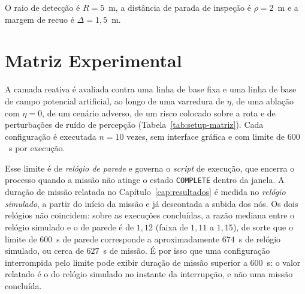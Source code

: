 O raio de detecção é $R=5$~m, a distância de parada de inspeção é $\rho=2$~m e a
margem de recuo é $\Delta=1{,}5$~m.

\section{Matriz Experimental}
\label{sec:setup-matriz}

A camada reativa é avaliada contra uma linha de base fixa e uma linha de base de
campo potencial artificial, ao longo de uma varredura de $\eta$, de uma ablação com
$\eta=0$, de um cenário adverso, de um risco colocado sobre a rota e de perturbações
de ruído de percepção (Tabela~\ref{tab:setup-matriz}). Cada configuração é executada
$n=10$ vezes, sem interface gráfica e com limite de $600$~s por execução.

Esse limite é de \emph{relógio de parede} e governa o \textit{script} de execução, que
encerra o processo quando a missão não atinge o estado \texttt{COMPLETE} dentro da
janela. A duração de missão relatada no Capítulo~\ref{cap:resultados} é medida no
\emph{relógio simulado}, a partir do início da missão e já descontada a subida dos nós.
Os dois relógios não coincidem: sobre as execuções concluídas, a razão mediana entre o
relógio simulado e o de parede é de $1{,}12$ (faixa de $1{,}11$ a $1{,}15$), de sorte que
o limite de $600$~s de parede corresponde a aproximadamente $674$~s de relógio simulado,
ou cerca de $627$~s de missão. É por isso que uma configuração interrompida pelo limite
pode exibir duração de missão superior a $600$~s: o valor relatado é o do relógio
simulado no instante da interrupção, e não uma missão concluída.

